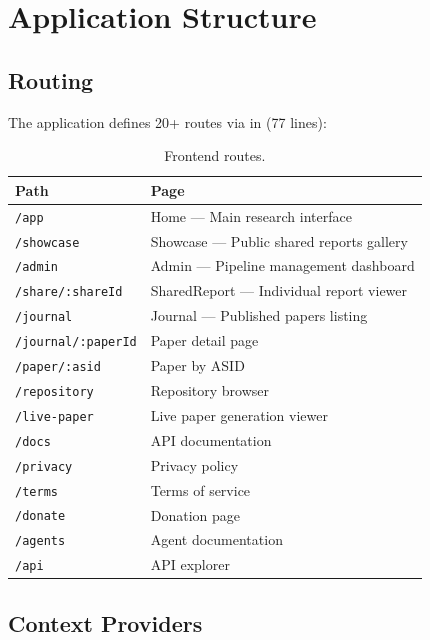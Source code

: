 \section{Application Structure}
\label{sec:frontend:structure}

\subsection{Routing}

The application defines 20+ routes via  in  (77 lines):

\begin{table}[H]
\centering
\caption{Frontend routes.}
\label{tab:frontend-routes}
\begin{tabularx}{\textwidth}{lX}
\toprule
\textbf{Path} & \textbf{Page} \\
\midrule
\texttt{/app} & Home --- Main research interface \\
\texttt{/showcase} & Showcase --- Public shared reports gallery \\
\texttt{/admin} & Admin --- Pipeline management dashboard \\
\texttt{/share/:shareId} & SharedReport --- Individual report viewer \\
\texttt{/journal} & Journal --- Published papers listing \\
\texttt{/journal/:paperId} & Paper detail page \\
\texttt{/paper/:asid} & Paper by ASID \\
\texttt{/repository} & Repository browser \\
\texttt{/live-paper} & Live paper generation viewer \\
\texttt{/docs} & API documentation \\
\texttt{/privacy} & Privacy policy \\
\texttt{/terms} & Terms of service \\
\texttt{/donate} & Donation page \\
\texttt{/agents} & Agent documentation \\
\texttt{/api} & API explorer \\
\bottomrule
\end{tabularx}
\end{table}

\subsection{Context Providers}

